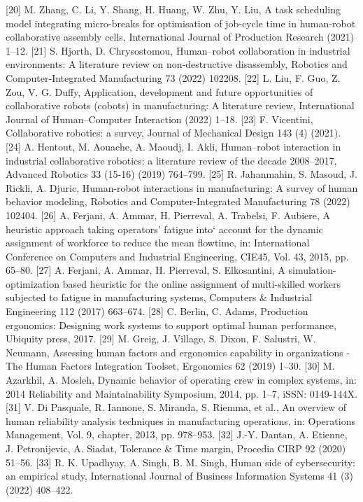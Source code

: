 [20]	M. Zhang, C. Li, Y. Shang, H. Huang, W. Zhu, Y. Liu, A task scheduling model integrating micro-breaks for optimisation of job-cycle time in human-robot collaborative assembly cells, International Journal of Production Research (2021) 1–12.
[21]	S. Hjorth, D. Chrysostomou, Human–robot collaboration in industrial environments: A literature review on non-destructive disassembly, Robotics and Computer-Integrated Manufacturing 73 (2022) 102208.
[22]	L. Liu, F. Guo, Z. Zou, V. G. Duffy, Application, development and future opportunities of collaborative robots
(cobots) in manufacturing: A literature review, International Journal of Human–Computer Interaction (2022)
1–18.
[23]	F. Vicentini, Collaborative robotics: a survey, Journal of Mechanical Design 143 (4) (2021).
[24]	A. Hentout, M. Aouache, A. Maoudj, I. Akli, Human–robot interaction in industrial collaborative robotics: a literature review of the decade 2008–2017, Advanced Robotics 33 (15-16) (2019) 764–799.
[25]	R. Jahanmahin, S. Masoud, J. Rickli, A. Djuric, Human-robot interactions in manufacturing: A survey of human behavior modeling, Robotics and Computer-Integrated Manufacturing 78 (2022) 102404.
[26]	A. Ferjani, A. Ammar, H. Pierreval, A. Trabelsi, F. Aubiere, A heuristic approach taking operators’ fatigue into` account for the dynamic assignment of workforce to reduce the mean flowtime, in: International Conference on Computers and Industrial Engineering, CIE45, Vol. 43, 2015, pp. 65–80.
[27]	A. Ferjani, A. Ammar, H. Pierreval, S. Elkosantini, A simulation-optimization based heuristic for the online assignment of multi-skilled workers subjected to fatigue in manufacturing systems, Computers & Industrial Engineering 112 (2017) 663–674.
[28]	C. Berlin, C. Adams, Production ergonomics: Designing work systems to support optimal human performance,
Ubiquity press, 2017.
[29]	M. Greig, J. Village, S. Dixon, F. Salustri, W. Neumann, Assessing human factors and ergonomics capability in organizations - The Human Factors Integration Toolset, Ergonomics 62 (2019) 1–30.
[30]	M. Azarkhil, A. Mosleh, Dynamic behavior of operating crew in complex systems, in: 2014 Reliability and
Maintainability Symposium, 2014, pp. 1–7, iSSN: 0149-144X.
[31]	V. Di Pasquale, R. Iannone, S. Miranda, S. Riemma, et al., An overview of human reliability analysis techniques in manufacturing operations, in: Operations Management, Vol. 9, chapter, 2013, pp. 978–953.
[32]	J.-Y. Dantan, A. Etienne, J. Petronijevic, A. Siadat, Tolerance & Time margin, Procedia CIRP 92 (2020) 51–56.
[33]	R. K. Upadhyay, A. Singh, B. M. Singh, Human side of cybersecurity: an empirical study, International Journal of Business Information Systems 41 (3) (2022) 408–422.

